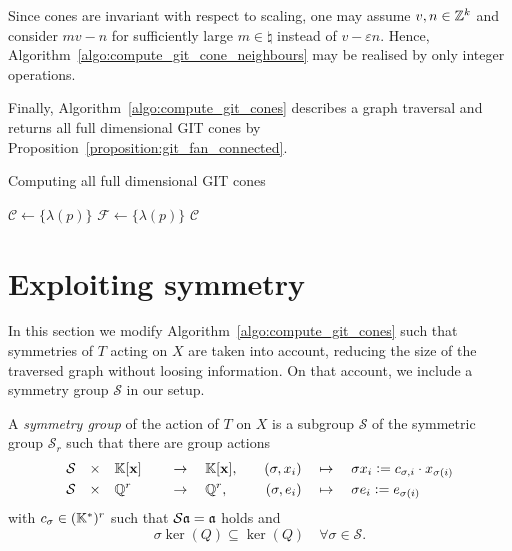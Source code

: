 \begin{remark}
	Since cones are invariant with respect to scaling, one may assume $v,n\in\mathbb{Z}^k$ and consider $mv-n$ for sufficiently large $m\in\natural$ instead of $v-\varepsilon n$. Hence, Algorithm~\ref{algo:compute_git_cone_neighbours} may be realised by only integer operations.
\end{remark}

Finally, Algorithm~\ref{algo:compute_git_cones} describes a graph traversal and returns all full dimensional GIT cones by Proposition~\ref{proposition:git_fan_connected}.

\begin{algorithm}
	\caption{Computing all full dimensional GIT cones}
	\label{algo:compute_git_cones}
	
	\BlankLine
	$\mathcal{C} \leftarrow \{\lambda(p)\}$\;
	$\mathcal{F} \leftarrow \{\lambda(p)\}$\;
	\Return $\mathcal{C}$\;
\end{algorithm}

\section{Exploiting symmetry}
\label{sec:exploiting_symmetry}

In this section we modify Algorithm~\ref{algo:compute_git_cones} such that symmetries of $T$ acting on $X$ are taken into account, reducing the size of the traversed graph without loosing information. On that account, we include a symmetry group $\mathcal{S}$ in our setup.

\begin{defi}
	\label{definition:symmetry_group}
	A \emph{symmetry group} of the action of $T$ on $X$ is a subgroup $\mathcal{S}$ of the symmetric group $\mathcal{S}_r$ such that there are group actions
	\begin{alignat*}{5}
		\mathcal{S} \quad\times\quad & \mathbb{K}[\mathbf{x}] && \quad\rightarrow\quad \mathbb{K}[\mathbf{x}],\quad & (\sigma, x_i) & \quad\mapsto\quad \sigma x_i \mathrel{\mathop:}= c_{\sigma,i} \cdot x_{\sigma(i)} \\
		\mathcal{S} \quad\times\quad & \mathbb{Q}^r && \quad\rightarrow\quad \mathbb{Q}^r,\quad & (\sigma, e_i) & \quad\mapsto\quad \sigma e_i \mathrel{\mathop:}= e_{\sigma(i)}
	\end{alignat*}
	with $c_\sigma\in(\mathbb{K}^*)^r$ such that $\mathcal{S}\mathfrak{a} = \mathfrak{a}$ holds and
	$$\sigma \ker(Q) \subseteq \ker(Q)\quad\forall\sigma\in \mathcal{S}.$$
\end{defi}

